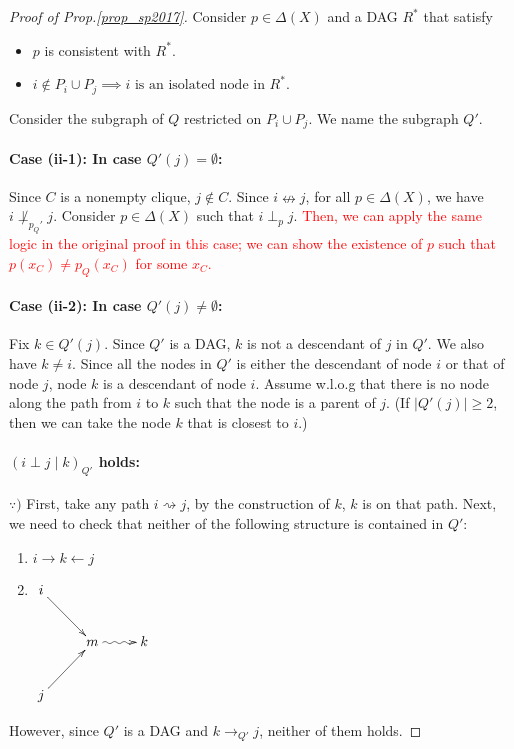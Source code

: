 \documentclass[11pt,a4paper,dvipdfmx]{article}
\theoremstyle{plain}
\newcommand{\ocomment}[1]{{\textcolor{red}{#1}}}
\begin{document}
\begin{proof}[Proof of Prop.\ref{prop_sp2017}]
	Consider $p \in \Delta(X)$ and a DAG $R^*$ that satisfy
	\begin{itemize}
		\item $p$ is consistent with $R^*$.
		\item $i \notin P_i \cup P_j \implies i \text{ is an isolated node in $R^*$.}$
	\end{itemize}
	Consider the subgraph of $Q$ restricted on $P_i \cup P_j$. We name the subgraph $Q'$. 
	
	
	
	\paragraph{Case (ii-1): In case $Q'(j) = \emptyset$:}
	Since $C$ is a nonempty clique, $j \notin C$. Since $i \nleftrightarrow j$, for all $p \in \Delta(X)$, we have $i \not\perp_{p_Q'} j$. Consider $p \in \Delta(X)$ such that $i \perp_{p} j$. \ocomment{Then, we can apply the same logic in the original proof in this case; we can show the existence of $p$ such that $p(x_C) \neq p_Q(x_C)$ for some $x_C$.}
	
	\paragraph{Case (ii-2): In case $Q'(j) \neq \emptyset$:}
	Fix $k \in Q'(j)$. Since $Q'$ is a DAG, $k$ is not a descendant of $j$ in $Q'$. We also have $k \neq i$. Since all the nodes in $Q'$ is either the descendant of node $i$ or that of node $j$, node $k$ is a descendant of node $i$. Assume w.l.o.g that there is no node along the path from $i$ to $k$ such that the node is a parent of $j$. (If $|Q'(j)| \geq 2$, then we can take the node $k$ that is closest to $i$.)
	
	\paragraph{$(i \perp j \mid k)_{Q'}$ holds:} $\because)$
	First, take any path $i \rightsquigarrow j$, by the construction of $k$, $k$ is on that path. Next, we need to check that neither of the following structure is contained in $Q'$:
	\begin{enumerate}
		\item $i \to k \leftarrow j$
		\item $\xymatrix{
		i \ar[rd] & \\
		& m \ar@{~>}[r]& k \\
		j \ar[ru] & 
		}$
	\end{enumerate}
	However, since $Q'$ is a DAG and $k \to_{Q'} j$, neither of them holds.
	

\end{proof}
\end{document}
